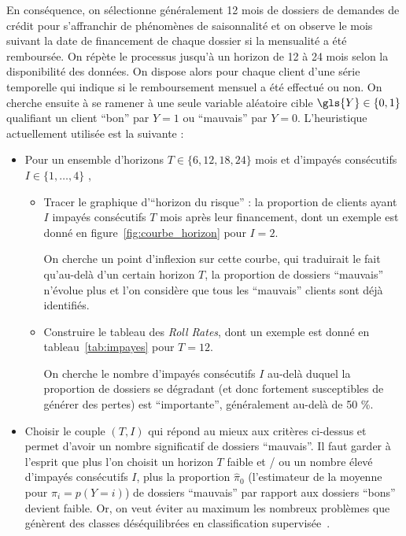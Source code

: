 En conséquence, on sélectionne généralement 12 mois de dossiers de demandes de crédit pour s'affranchir de phénomènes de saisonnalité et on observe le mois suivant la date de financement de chaque dossier si la mensualité a été remboursée. On répète le processus jusqu'à un horizon de 12 à 24 mois selon la disponibilité des données. On dispose alors pour chaque client d'une série temporelle qui indique si le remboursement mensuel a été effectué ou non. On cherche ensuite à se ramener à une seule variable aléatoire cible $\gls{Y} \in \{0,1\}$ qualifiant un client ``bon'' par $Y=1$ ou ``mauvais'' par $Y=0$. L'heuristique actuellement utilisée est la suivante :
\begin{itemize}
\item Pour un ensemble d'horizons $T \in \{6,12,18,24\}$ mois et d'impayés consécutifs $I \in \{1,\dots,4\}$ ,
\begin{itemize}
\item Tracer le graphique d'``horizon du risque'' : la proportion de clients ayant $I$ impayés consécutifs $T$ mois après leur financement, dont un exemple est donné en figure~\ref{fig:courbe_horizon} pour $I = 2$.

On cherche un point d'inflexion sur cette courbe, qui traduirait le fait qu'au-delà d'un certain horizon $T$, la proportion de dossiers ``mauvais'' n'évolue plus et l'on considère que tous les ``mauvais'' clients sont déjà identifiés.
\item Construire le tableau des \textit{Roll Rates}, dont un exemple est donné en tableau~\ref{tab:impayes} pour $T = 12$.

On cherche le nombre d'impayés consécutifs $I$ au-delà duquel la proportion de dossiers se dégradant (et donc fortement susceptibles de générer des pertes) est ``importante'', généralement au-delà de 50 \%. 
\end{itemize}
\item Choisir le couple $(T,I)$ qui répond au mieux aux critères ci-dessus et permet d'avoir un nombre significatif de dossiers ``mauvais''. Il faut garder à l'esprit que plus l'on choisit un horizon $T$ faible et / ou un nombre élevé d'impayés consécutifs $I$, plus la proportion $\hat{\pi}_0$ (l'estimateur de la moyenne pour $\pi_i = p(Y=i)$) de dossiers ``mauvais'' par rapport aux dossiers ``bons'' devient faible.
Or, on veut éviter au maximum les nombreux problèmes que génèrent des classes déséquilibrées en classification supervisée~\cite{sun2009classification}.
\end{itemize}

